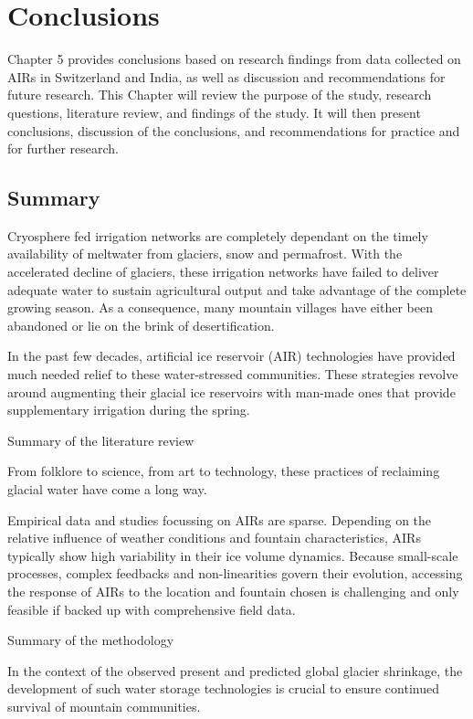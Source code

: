 \chapter{Conclusions}

Chapter 5 provides conclusions based on research findings from data collected on AIRs in Switzerland and India,
as well as discussion and recommendations for future research. This Chapter will review the purpose of the
study, research questions, literature review, and findings of the study. It will then present conclusions,
discussion of the conclusions, and recommendations for practice and for further research.

\section{Summary}

Cryosphere fed irrigation networks are completely dependant on the timely availability of meltwater from
glaciers, snow and permafrost. With the accelerated decline of glaciers, these irrigation networks have failed
to deliver adequate water to sustain agricultural output and take advantage of the complete growing season. As a
consequence, many mountain villages have either been abandoned or lie on the brink of desertification.

In the past few decades, artificial ice reservoir (AIR) technologies have provided much needed relief to these
water-stressed communities. These strategies revolve around augmenting their glacial ice reservoirs with
man-made ones that provide supplementary irrigation during the spring. 

Summary of the literature review

From folklore to science, from art to technology, these practices of reclaiming glacial water have come a long
way. 

Empirical data and studies focussing on AIRs are sparse. Depending on the relative influence of weather
conditions and fountain characteristics, AIRs typically show high variability in their ice volume dynamics.
Because small-scale processes, complex feedbacks and non-linearities govern their evolution, accessing the
response of AIRs to the location and fountain chosen is challenging and only feasible if backed up with
comprehensive field data. 

Summary of the methodology

In the context of the observed present and predicted global glacier shrinkage, the development of such water
storage technologies is crucial to ensure continued survival of mountain communities.


